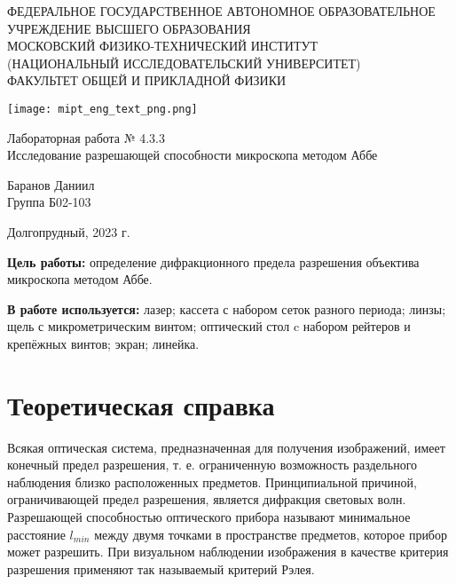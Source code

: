 \documentclass[a4paper,12pt]{article} %
\begin{document}
\begin{center}
	\footnotesize{ФЕДЕРАЛЬНОЕ ГОСУДАРСТВЕННОЕ АВТОНОМНОЕ ОБРАЗОВАТЕЛЬНОЕ 			УЧРЕЖДЕНИЕ ВЫСШЕГО ОБРАЗОВАНИЯ}\\
	\footnotesize{МОСКОВСКИЙ ФИЗИКО-ТЕХНИЧЕСКИЙ ИНСТИТУТ\\(НАЦИОНАЛЬНЫЙ 			ИССЛЕДОВАТЕЛЬСКИЙ УНИВЕРСИТЕТ)}\\
	\footnotesize{ФАКУЛЬТЕТ ОБЩЕЙ И ПРИКЛАДНОЙ ФИЗИКИ\\}
	\hfill \break
	\hfill \break
	\hfill \break
	\hfill \break
\end{center}


\begin{figure*}[h]
    \centering
    \texttt{[image: mipt\_eng\_text\_png.png]}
    \label{fig:my_label}
\end{figure*}


\begin{center}   
    \hfill \break
	\hfill \break
	\hfill \break
	\large{Лабораторная работа № 4.3.3\\ \hfill \break\Large{Исследование разрешающей способности микроскопа методом Аббе}}\\
	\hfill \break
	\hfill \break
	\hfill \break
	\hfill \break
	\begin{flushright}
		Баранов Даниил\\
		Группа Б02-103
	\end{flushright}
	\hfill \break
	\hfill \break
\end{center}
\hfill \break
\hfill \break
\hfill \break
\hfill \break
\begin{center}
	Долгопрудный, 2023 г.
\end{center}
\thispagestyle{empty}

\newpage

\textbf{Цель работы:} определение дифракционного предела разрешения объектива микроскопа методом Аббе.

\textbf{В работе используется:} лазер; кассета с набором сеток разного периода; линзы; щель с микрометрическим винтом; оптический стол c набором рейтеров и крепёжных винтов; экран; линейка.

\section{Теоретическая справка}

Всякая оптическая система, предназначенная для получения изображений, имеет конечный предел разрешения, т. е. ограниченную возможность раздельного наблюдения близко расположенных предметов. Принципиальной причиной, ограничивающей предел разрешения, является дифракция световых волн. Разрешающей способностью оптического прибора называют минимальное расстояние $l_{min}$ между двумя точками в пространстве предметов, которое прибор может разрешить. При визуальном наблюдении изображения в качестве критерия разрешения применяют так называемый критерий Рэлея.
\end{document}
